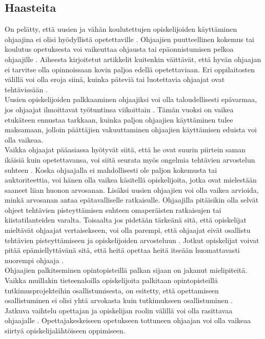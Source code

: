 \documentclass[finnish]{tktltiki2}
\theoremstyle{definition}
\theoremstyle{remark}
\begin{document}
\subsection{Haasteita}
On pelätty, että uusien ja vähän koulutettujen opiskelijoiden käyttäminen ohjaajina ei olisi hyödyllistä opetettaville \cite{Harper02}. Ohjaajien puutteellinen kokemus tai koulutus opetuksesta voi vaikeuttaa ohjausta tai epäonnistumisen pelkoa ohjaajille \cite{Mark11}. Aiheesta kirjoitetut artikkelit kuitenkin väittävät, että hyvän ohjaajan ei tarvitse olla opinnoissaan kovin paljoa edellä opetettaviaan. Eri oppilaitosten välillä voi olla eroja siinä, kuinka päteviä tai luotettavia ohjaajat ovat tehtävissään \cite{Reges03}.
\\
Uusien opiskelijoiden palkkaaminen ohjaajiksi voi olla taloudellisesti epävarmaa, jos ohjaajat ilmoittavat työtuntinsa viikoittain \cite{Reges03}. Tämän vuoksi on vaikea etukäteen ennustaa tarkkaan, kuinka paljon ohjaajien käyttäminen tulee maksamaan, jolloin päättäjien vakuuttaminen ohjaajien käyttämisen eduista voi olla vaikeaa.
\\
Vaikka ohjaajat pääasiassa hyötyvät siitä, että he ovat suurin piirtein saman ikäisiä kuin opetettavansa, voi siitä seurata myös ongelmia tehtävien arvostelun suhteen \cite{Roberts95}. Koska ohjaajalla ei mahdollisesti ole paljon kokemusta tai auktoriteettia, voi hänen olla vaikea käsitellä opiskelijoita, jotka ovat mielestään saaneet liian huonon arvosanan. Lisäksi uusien ohjaajien voi olla vaikea arvioida, minkä arvosanan antaa epätavalliselle ratkaisulle. Ohjaajilla pitäisikin olla selvät ohjeet tehtävien pisteyttämisen suhteen omaperäisten ratkaisujen tai kiistatilanteiden varalta. Toisaalta jos pidetään tärkeänä sitä, että opiskelijat mieltävät ohjaajat vertaisekseen, voi olla parempi, että ohjaajat eivät osallistu tehtävien pisteyttämiseen ja opiskelijoiden arvosteluun \cite{Morgan02}. Jotkut opiskelijat voivat pitää epämiellyttävänä sitä, että heitä opettaa heitä itseään huomattavasti nuorempi ohjaaja \cite{Sperry08}.
\\
Ohjaajien palkitseminen opintopisteillä palkan sijaan on jakanut mielipiteitä. Vaikka muillakin tieteenaloilla opiskelijoita palkitaan opintopisteillä tutkimusprojekteihin osallistumisesta, on esitetty, että opettamiseen osallistuminen ei olisi yhtä arvokasta kuin tutkimukseen osallistuminen \cite{Reges88}.
\\
Jatkuva vaihtelu opettajan ja opiskelijan roolin välillä voi olla rasittavaa ohjaajalle \cite{Mark11}. Opettajakeskeiseen opetukseen tottuneen ohjaajan voi olla vaikeaa siirtyä opiskelijalähtöiseen oppimiseen.
\end{document}
